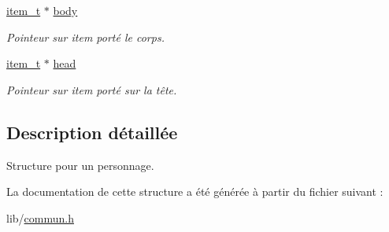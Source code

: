 \begin{DoxyCompactItemize}
\hyperlink{structitem__t}{item\+\_\+t} $\ast$ \hyperlink{structperso__t_ad95e816d354cc2a3d0ed11be55c6407e}{body}
\begin{DoxyCompactList}\small\item\em Pointeur sur item porté le corps. \end{DoxyCompactList}\item 
\mbox{\label{structperso__t_a8f5be8ec76f5bc34a9c83a25f0c77a84}} 
\hyperlink{structitem__t}{item\+\_\+t} $\ast$ \hyperlink{structperso__t_a8f5be8ec76f5bc34a9c83a25f0c77a84}{head}
\begin{DoxyCompactList}\small\item\em Pointeur sur item porté sur la tête. \end{DoxyCompactList}\end{DoxyCompactItemize}


\subsection{Description détaillée}
Structure pour un personnage. 

La documentation de cette structure a été générée à partir du fichier suivant \+:\begin{DoxyCompactItemize}
\item 
lib/\hyperlink{commun_8h}{commun.\+h}\end{DoxyCompactItemize}
